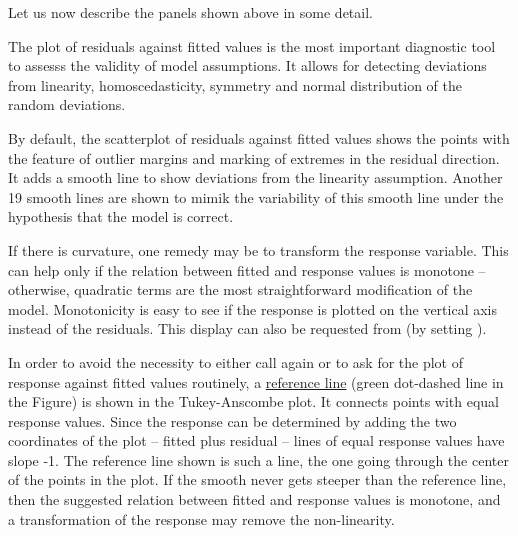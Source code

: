 \documentclass[11pt]{article}\usepackage[]{graphicx}\usepackage[]{color}
\begin{document}


Let us now describe the panels shown above in some detail.

The plot of residuals against fitted values is the most important
diagnostic tool to assesss the validity of model assumptions.
It allows for detecting deviations from linearity, homoscedasticity,
symmetry and normal distribution of the random deviations.

By default, the scatterplot of residuals against fitted values shows
the points with the feature of outlier margins and marking of extremes in
the residual direction. It adds a smooth line to show deviations from
the linearity assumption. Another 19 smooth lines are shown to 
mimik the variability of this smooth line under the hypothesis that the
model is correct.

If there is curvature, one remedy may be to transform the response
variable. This can help only if the relation between fitted and
response values is monotone -- otherwise, quadratic terms are the
most straightforward modification of the model.
Monotonicity is easy to see if the response is plotted on the vertical
axis instead of the residuals.
This display can also be requested from 
(by setting ).

In order to avoid the necessity to either call  again or to 
ask for the plot of response against fitted values routinely,
a \ul{reference line} (green dot-dashed line in the Figure)
is shown in the Tukey-Anscombe plot.
It connects points with equal response values. Since the response can be
determined by adding the two coordinates of the plot -- 
fitted plus residual -- lines of equal response values have slope -1.
The reference line shown is such a line, the one going through the center
of the points in the plot.
If the smooth never gets steeper than the reference line, then the
suggested relation between fitted and response values is monotone, 
and a transformation of the response may remove the non-linearity.
\end{document}
